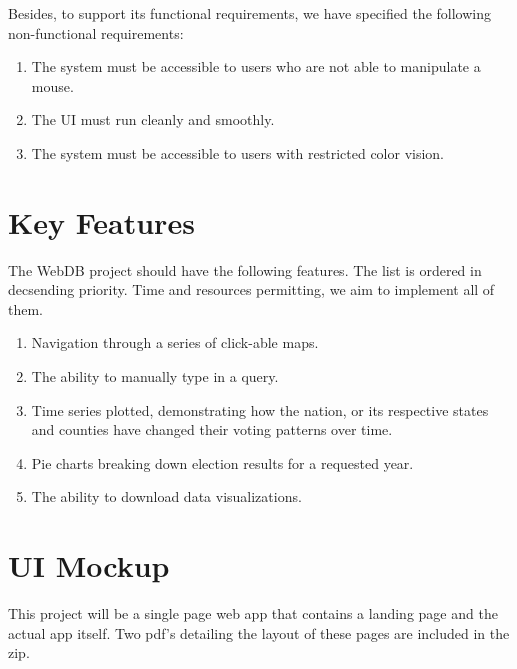 \documentclass[12pt]{article}
\begin{document}
Besides, to support its functional requirements, we have specified the following non-functional requirements:
\begin{enumerate}
 \item The system must be accessible to users who are not able to manipulate a mouse.
 \item The UI must run cleanly and smoothly.
 \item The system must be accessible to users with restricted color vision.
\end{enumerate}

\section{Key Features}
The WebDB project should have the following features. The list is ordered in decsending priority. Time and resources
permitting, we aim to implement all of them.
\begin{enumerate}
 \item Navigation through a series of click-able maps.
 \item The ability to manually type in a query.
 \item Time series plotted, demonstrating how the nation, or its respective states and counties have changed their voting patterns over time.
 \item Pie charts breaking down election results for a requested year. 
 \item The ability to download data visualizations.
\end{enumerate}

\section{UI Mockup}
This project will be a single page web app that contains a landing page and the actual app itself. Two pdf's detailing the layout of these pages are included in the zip.
\end{document}
